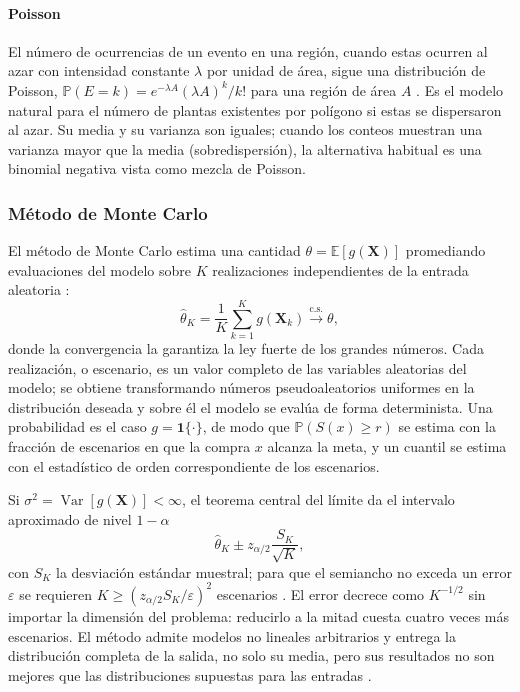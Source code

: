 \paragraph{Poisson} El número de ocurrencias de un evento en una región, cuando estas ocurren al azar con intensidad constante $\lambda$ por unidad de área, sigue una distribución de Poisson, $\mathbb{P}(E=k)=e^{-\lambda A}(\lambda A)^{k}/k!$ para una región de área $A$ \autocite{:berger2002}. Es el modelo natural para el número de plantas existentes por polígono si estas se dispersaron al azar. Su media y su varianza son iguales; cuando los conteos muestran una varianza mayor que la media (sobredispersión), la alternativa habitual es una binomial negativa vista como mezcla de Poisson.

\subsubsection{Método de Monte Carlo}
\label{subsec:montecarlo}

El método de Monte Carlo estima una cantidad $\theta=\mathbb{E}[g(\mathbf{X})]$ promediando evaluaciones del modelo sobre $K$ realizaciones independientes de la entrada aleatoria \autocite{:robert2004}:
\begin{equation}
  \hat{\theta}_K=\frac{1}{K}\sum_{k=1}^{K}g(\mathbf{X}_k)\xrightarrow{\text{c.s.}}\theta,
  \label{eq:montecarlo}
\end{equation}
donde la convergencia la garantiza la ley fuerte de los grandes números. Cada realización, o escenario, es un valor completo de las variables aleatorias del modelo; se obtiene transformando números pseudoaleatorios uniformes en la distribución deseada \autocite{:ross2013} y sobre él el modelo se evalúa de forma determinista. Una probabilidad es el caso $g=\mathbf{1}\{\cdot\}$, de modo que $\mathbb{P}(S(x)\geq r)$ se estima con la fracción de escenarios en que la compra $x$ alcanza la meta, y un cuantil se estima con el estadístico de orden correspondiente de los escenarios.

Si $\sigma^{2}=\operatorname{Var}[g(\mathbf{X})]<\infty$, el teorema central del límite da el intervalo aproximado de nivel $1-\alpha$
\begin{equation}
  \hat{\theta}_K\pm z_{\alpha/2}\frac{S_K}{\sqrt{K}},
  \label{eq:intervalo}
\end{equation}
con $S_K$ la desviación estándar muestral; para que el semiancho no exceda un error $\varepsilon$ se requieren $K\geq(z_{\alpha/2}S_K/\varepsilon)^{2}$ escenarios \autocite{:ross2013}. El error decrece como $K^{-1/2}$ sin importar la dimensión del problema: reducirlo a la mitad cuesta cuatro veces más escenarios. El método admite modelos no lineales arbitrarios y entrega la distribución completa de la salida, no solo su media, pero sus resultados no son mejores que las distribuciones supuestas para las entradas \autocite{:robert2004}.

